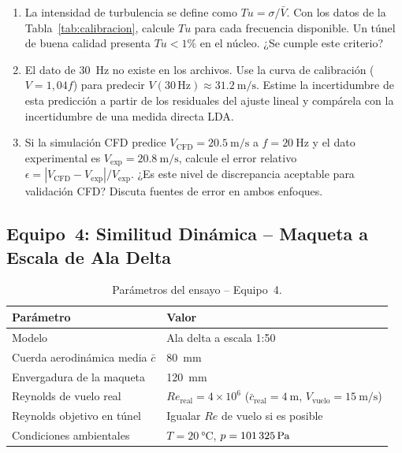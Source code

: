 \documentclass[12pt,a4paper]{article}
\begin{document}
\begin{enumerate}
	\item[\textbf{P3.1}] La intensidad de turbulencia se define como
	      $Tu = \sigma / \bar{V}$.  Con los datos de la Tabla~\ref{tab:calibracion},
	      calcule $Tu$ para cada frecuencia disponible.  Un túnel de buena calidad
	      presenta $Tu < 1\%$ en el núcleo.  ¿Se cumple este criterio?

	\item[\textbf{P3.2}] El dato de 30~Hz no existe en los archivos.
	      Use la curva de calibración ($V = 1{,}04 f$) para predecir
	      $V(30\,\text{Hz}) \approx \SI{31.2}{\m\per\s}$.  Estime la incertidumbre
	      de esta predicción a partir de los residuales del ajuste lineal y
	      compárela con la incertidumbre de una medida directa LDA.

	\item[\textbf{P3.3}] Si la simulación CFD predice $V_\mathrm{CFD} =
		      \SI{20.5}{\m\per\s}$ a $f = \SI{20}{\Hz}$ y el dato experimental es
	      $V_\mathrm{exp} = \SI{20.8}{\m\per\s}$, calcule el error relativo
	      $\epsilon = |V_\mathrm{CFD} - V_\mathrm{exp}| / V_\mathrm{exp}$.
	      ¿Es este nivel de discrepancia aceptable para validación CFD?
	      Discuta fuentes de error en ambos enfoques.
\end{enumerate}

\subsection{Equipo~4: Similitud Dinámica -- Maqueta a Escala de Ala Delta}
\label{sec:eq4}

\begin{table}[H]
	\centering
	\caption{Parámetros del ensayo -- Equipo~4.}
	\small
	\begin{tabular}{l l}
		\toprule
		\textbf{Parámetro}                  & \textbf{Valor}                      \\
		\midrule
		Modelo                              & Ala delta a escala 1:50             \\
		Cuerda aerodinámica media $\bar{c}$ & \SI{80}{\mm}                        \\
		Envergadura de la maqueta           & \SI{120}{\mm}                       \\
		Reynolds de vuelo real              & $Re_\mathrm{real} = 4 \times 10^6$
		($\bar{c}_\mathrm{real} = \SI{4}{\m}$,
		$V_\mathrm{vuelo} = \SI{15}{\m\per\s}$)                                   \\
		Reynolds objetivo en túnel          & Igualar $Re$ de vuelo si es posible \\
		\rowcolor{aeroyellow!20}
		Condiciones ambientales             & $T = \SI{20}{\degreeCelsius}$,
		$p = \SI{101\,325}{\pascal}$                                              \\
		\bottomrule
	\end{tabular}
\end{table}
\end{document}
